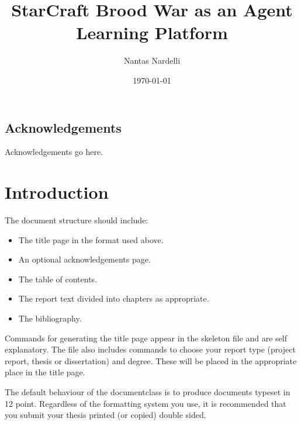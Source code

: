 \documentclass[bsc,frontabs,twoside,singlespacing,parskip,deptreport]{infthesis}     %
\begin{document}
\title{StarCraft Brood War as an Agent Learning Platform}

\author{Nantas Nardelli}


\date{\today}


\maketitle

\section*{Acknowledgements}
Acknowledgements go here. 

\tableofcontents



\chapter{Introduction}

The document structure should include:
\begin{itemize}
\item
The title page  in the format used above.
\item
An optional acknowledgements page.
\item
The table of contents.
\item
The report text divided into chapters as appropriate.
\item
The bibliography.
\end{itemize}

Commands for generating the title page appear in the skeleton file and
are self explanatory.
The file also includes commands to choose your report type (project
report, thesis or dissertation) and degree.
These will be placed in the appropriate place in the title page. 

The default behaviour of the documentclass is to produce documents typeset in
12 point.  Regardless of the formatting system you use, 
it is recommended that you submit your thesis printed (or copied) 
double sided.
\end{document}
